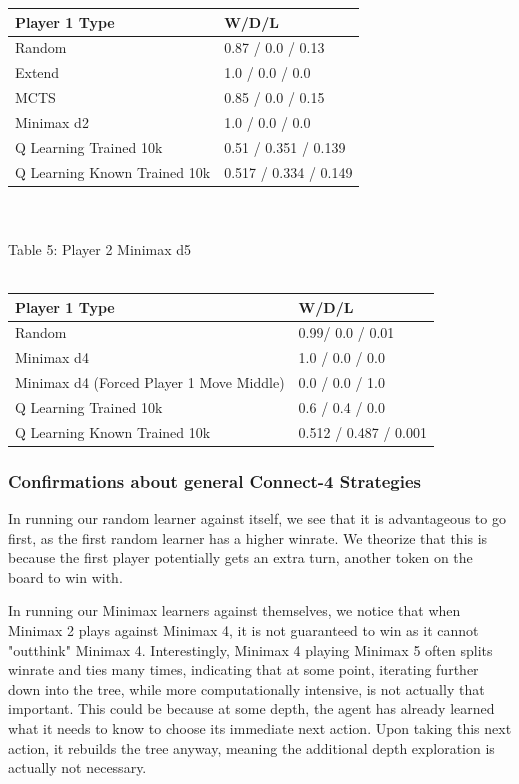 \documentclass[12pt]{article}
\begin{document}
\begin{tabular}{l|l}
Player 1 Type                & W/D/L                           \\\hline
Random                       &  0.87  / 0.0 / 0.13             \\
Extend                       & 1.0  / 0.0 / 0.0                \\
MCTS & 0.85 / 0.0 / 0.15 \\
Minimax d2                   & 1.0   / 0.0 /  0.0              \\
Q Learning Trained 10k         &  0.51  / 0.351 / 0.139        \\
Q Learning Known Trained 10k & 0.517 / 0.334 / 0.149 
\end{tabular}\\\\
Table 5: Player 2 Minimax d5\\\\
\begin{tabular}{l|l}
Player 1 Type                     & W/D/L               \\\hline
Random                            &  0.99/ 0.0 / 0.01     \\
Minimax d4                        & 1.0 / 0.0 / 0.0       \\
Minimax d4 (Forced Player 1 Move Middle)   & 0.0  / 0.0 / 1.0    \\
Q Learning Trained 10k            & 0.6 / 0.4 / 0.0       \\
Q Learning Known Trained 10k      & 0.512 / 0.487 / 0.001
\end{tabular}

\subsubsection{Confirmations about general Connect-4 Strategies}

In running our random learner against itself, we see that it is advantageous to go first, as the first random learner has a higher winrate. We theorize that this is because the first player potentially gets an extra turn, another token on the board to win with.

In running our Minimax learners against themselves, we notice that when Minimax 2 plays against Minimax 4, it is not guaranteed to win as it cannot "outthink" Minimax 4. Interestingly, Minimax 4 playing Minimax 5 often splits winrate and ties many times, indicating that at some point, iterating further down into the tree, while more computationally intensive, is not actually that important. This could be because at some depth, the agent has already learned what it needs to know to choose its immediate next action. Upon taking this next action, it rebuilds the tree anyway, meaning the additional depth exploration is actually not necessary.
\end{document}
